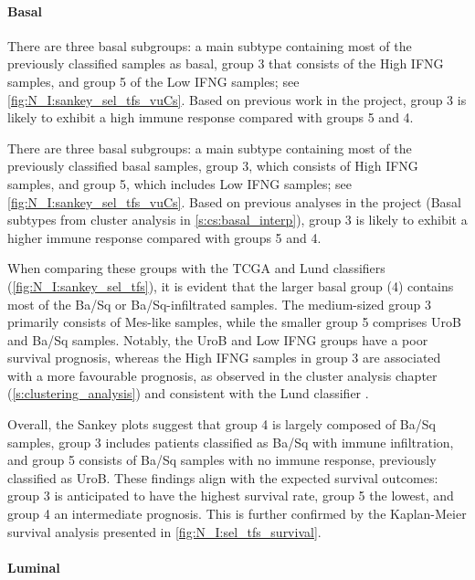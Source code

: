 \paragraph*{Basal}

There are three basal subgroups: a main subtype containing most of the previously classified samples as basal, group 3 that consists of the High IFNG samples, and group 5 of the Low IFNG samples; see \cref{fig:N_I:sankey_sel_tfs_vuCs}. Based on previous work in the project, group 3 is likely to exhibit a high immune response compared with groups 5 and 4.

There are three basal subgroups: a main subtype containing most of the previously classified basal samples, group 3, which consists of High IFNG samples, and group 5, which includes Low IFNG samples; see \cref{fig:N_I:sankey_sel_tfs_vuCs}. Based on previous analyses in the project (Basal subtypes from cluster analysis in \cref{s:cs:basal_interp}), group 3 is likely to exhibit a higher immune response compared with groups 5 and 4.

When comparing these groups with the TCGA and Lund classifiers (\cref{fig:N_I:sankey_sel_tfs}), it is evident that the larger basal group (4) contains most of the Ba/Sq or Ba/Sq-infiltrated samples. The medium-sized group 3 primarily consists of Mes-like samples, while the smaller group 5 comprises UroB and Ba/Sq samples. Notably, the UroB and Low IFNG groups have a poor survival prognosis, whereas the High IFNG samples in group 3 are associated with a more favourable prognosis, as observed in the cluster analysis chapter (\cref{s:clustering_analysis}) and consistent with the Lund classifier \citep{Marzouka2018-ge}.

Overall, the Sankey plots suggest that group 4 is largely composed of Ba/Sq samples, group 3 includes patients classified as Ba/Sq with immune infiltration, and group 5 consists of Ba/Sq samples with no immune response, previously classified as UroB. These findings align with the expected survival outcomes: group 3 is anticipated to have the highest survival rate, group 5 the lowest, and group 4 an intermediate prognosis. This is further confirmed by the Kaplan-Meier survival analysis presented in \cref{fig:N_I:sel_tfs_survival}.

\paragraph*{Luminal}

